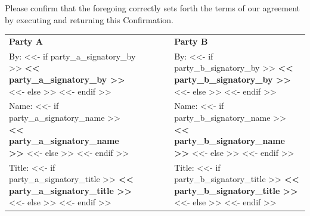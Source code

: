 \documentclass[11pt, a4paper]{article}
\begin{document}
\vspace{0.4cm}

\noindent Please confirm that the foregoing correctly sets forth the terms of our agreement by executing and returning this Confirmation.

\vspace{0.8cm}

\noindent
\begin{tabular}{@{}p{0.45\linewidth} p{0.1\linewidth} p{0.45\linewidth}@{}}
\textbf{Party A} & & \textbf{Party B} \\[0.4cm]
By: <<- if party_a_signatory_by >> \textbf{<< party_a_signatory_by >>} <<- else >> \hrulefill <<- endif >> & & By: <<- if party_b_signatory_by >> \textbf{<< party_b_signatory_by >>} <<- else >> \hrulefill <<- endif >> \\
Name: <<- if party_a_signatory_name >> \textbf{<< party_a_signatory_name >>} <<- else >> \hrulefill <<- endif >> & & Name: <<- if party_b_signatory_name >> \textbf{<< party_b_signatory_name >>} <<- else >> \hrulefill <<- endif >> \\
Title: <<- if party_a_signatory_title >> \textbf{<< party_a_signatory_title >>} <<- else >> \hrulefill <<- endif >> & & Title: <<- if party_b_signatory_title >> \textbf{<< party_b_signatory_title >>} <<- else >> \hrulefill <<- endif >> \\
\end{tabular}
\end{document}

